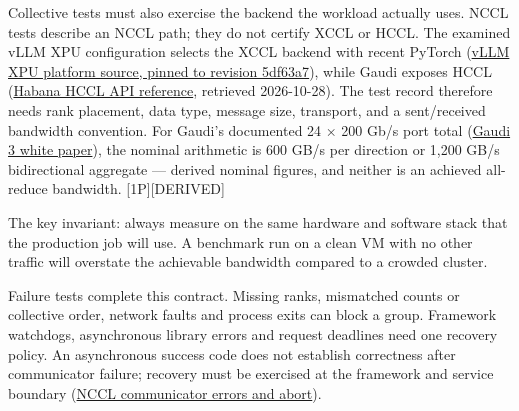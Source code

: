 Collective tests must also exercise the backend the workload actually
uses. NCCL tests describe an NCCL path; they do not certify XCCL or
HCCL. The examined vLLM XPU configuration selects the XCCL backend with
recent PyTorch
(\href{https://raw.githubusercontent.com/vllm-project/vllm/5df63a7203cdb9328d824a27b682e77c7b9928be/vllm/platforms/xpu.py}{vLLM
XPU platform source, pinned to revision 5df63a7}), while Gaudi exposes
HCCL
(\href{https://docs.habana.ai/en/latest/API_Reference_Guides/HCCL_APIs/index.html}{Habana
HCCL API reference}, retrieved 2026-10-28). The test record therefore
needs rank placement, data type, message size, transport, and a
sent/received bandwidth convention. For Gaudi's documented 24 × 200 Gb/s
port total
(\href{https://cdrdv2-public.intel.com/817486/gaudi-3-ai-accelerator-white-paper.pdf}{Gaudi
3 white paper}), the nominal arithmetic is 600 GB/s per direction or
1,200 GB/s bidirectional aggregate --- derived nominal figures, and
neither is an achieved all-reduce bandwidth. \mbox{{[}1P{]}}\hspace{0pt}\mbox{{[}DERIVED{]}}

The key invariant: always measure on the same hardware and software
stack that the production job will use. A benchmark run on a clean VM
with no other traffic will overstate the achievable bandwidth compared
to a crowded cluster.

Failure tests complete this contract. Missing ranks, mismatched counts
or collective order, network faults and process exits can block a group.
Framework watchdogs, asynchronous library errors and request deadlines
need one recovery policy. An asynchronous success code does not
establish correctness after communicator failure; recovery must be
exercised at the framework and service boundary
(\href{https://docs.nvidia.com/deeplearning/nccl/user-guide/docs/api/comms.html\#ncclcommgetasyncerror}{NCCL
communicator errors and abort}).

\label{common-mistakes}


